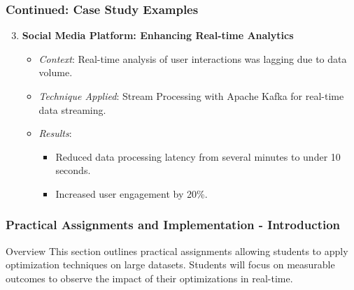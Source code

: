 \documentclass[aspectratio=169]{beamer}
\begin{document}
\begin{frame}[fragile]
    \frametitle{Continued: Case Study Examples}
    \begin{enumerate}
        \setcounter{enumi}{2} %
        \item \textbf{Social Media Platform: Enhancing Real-time Analytics}
            \begin{itemize}
                \item \textit{Context}: Real-time analysis of user interactions was lagging due to data volume.
                \item \textit{Technique Applied}: Stream Processing with Apache Kafka for real-time data streaming.
                \item \textit{Results}:
                    \begin{itemize}
                        \item Reduced data processing latency from several minutes to under 10 seconds.
                        \item Increased user engagement by 20\%.
                    \end{itemize}
            \end{itemize}
    \end{enumerate}
\end{frame}

\begin{frame}[fragile]
    \frametitle{Practical Assignments and Implementation - Introduction}
    \begin{block}{Overview}
        This section outlines practical assignments allowing students to apply optimization techniques on large datasets. 
        Students will focus on measurable outcomes to observe the impact of their optimizations in real-time.
    \end{block}
\end{frame}
\end{document}
